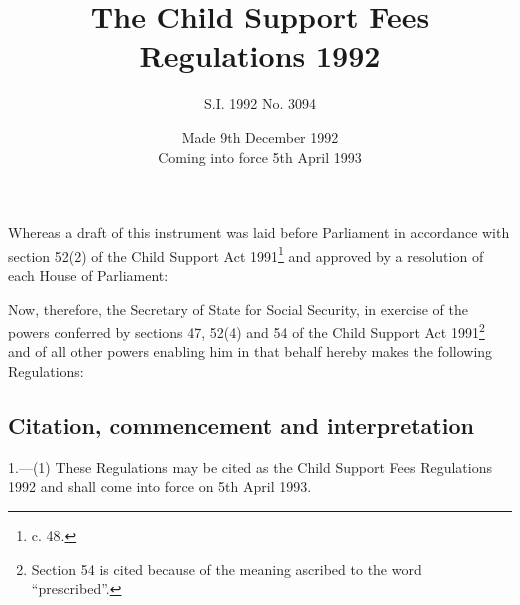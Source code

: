 \documentclass[a4paper]{article}
\title{The Child Support Fees Regulations 1992}
\author{S.I. 1992 No. 3094}
\date{Made 9th December 1992\\Coming into force 5th April 1993}
\begin{document}
\maketitle

\noindent
Whereas a draft of this instrument was laid before Parliament in accordance with section 52(2) of the Child Support Act 1991\footnote{ c. 48.} and approved by a resolution of each House of Parliament:

Now, therefore, the Secretary of State for Social Security, in exercise of the powers conferred by sections 47, 52(4) and 54 of the Child Support Act 1991\footnote{\frenchspacing Section 54 is cited because of the meaning ascribed to the word “prescribed”.} and of all other powers enabling him in that behalf hereby makes the following Regulations:

{\sloppy

\tableofcontents

}

\setcounter{secnumdepth}{-2}

\subsection[1. Citation, commencement and interpretation]{Citation, commencement and interpretation}

1.—(1) These Regulations may be cited as the Child Support Fees Regulations 1992 and shall come into force on 5th April 1993.
\end{document}
